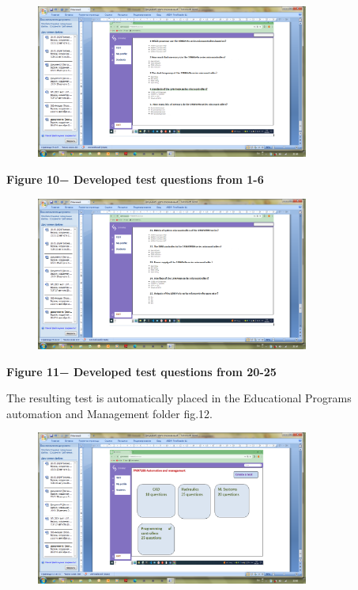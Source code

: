 \begin{figure}[H]
	\centering
	\includegraphics[width=0.8\textwidth]{assets/54}
	\caption*{}
\end{figure}

{\bfseries Figure 10− Developed test questions from 1-6}

\begin{figure}[H]
	\centering
	\includegraphics[width=0.8\textwidth]{assets/55}
	\caption*{}
\end{figure}

{\bfseries Figure 11− Developed test questions from 20-25}

The resulting test is automatically placed in the Educational Programs
automation and Management folder fig.12.

\begin{figure}[H]
	\centering
	\includegraphics[width=0.8\textwidth]{assets/56}
	\caption*{}
\end{figure}

